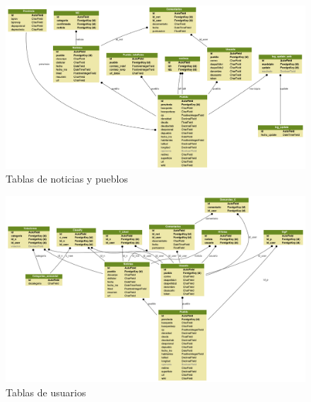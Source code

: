 \begin{figure}
\begin{center}
\includegraphics[scale=0.38]{basededatos/semandal_noticias2.png}
\caption{Tablas de noticias y pueblos}
\label{fig:noticias}
\end{center}
\end{figure}

\begin{figure}
\begin{center}
\includegraphics[scale=0.35]{basededatos/semandal_usuarios.png} 
\caption{Tablas de usuarios}
\label{fig:usuarios}
\end{center}
\end{figure}